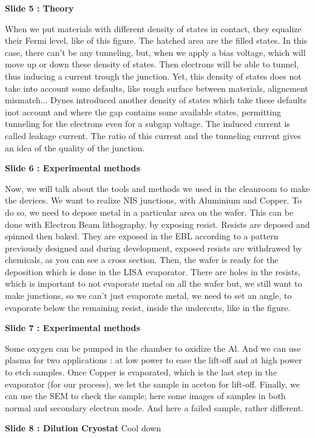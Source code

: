 \documentclass[a4paper,11pt]{article}
\begin{document}
{\Large \textbf{Slide 5 : Theory}}

When we put materials with different density of states in contact, they equalize their Fermi level, like of this figure. The hatched area are the filled states. In this case, there can't be any tunneling, but, when we apply a bias voltage, which will move up or down these density of states. Then electrons will be able to tunnel, thus inducing a current trough the junction. Yet, this density of states does not take into account some defaults, like rough surface between materials, alignement mismatch... Dynes introduced another density of states which take these defaults inot account and where the gap contains some available states, permitting tunneling for the electrons even for a subgap voltage. The induced current is called leakage current. The ratio of this current and the tunneling current gives an idea of the quality of the junction.
\medbreak

{\Large \textbf{Slide 6 : Experimental methods}}

Now, we will talk about the tools and methods we used in the cleanroom to make the devices. We want to realize NIS junctions, with Aluminium and Copper. To do so, we need to depose metal in a particular area on the wafer. This can be done with Electron Beam lithography, by exposing resist. Resists are deposed and spinned then baked. They are exposed in the EBL according to a pattern previously designed and during development, exposed resists are withdrawed by chemicals, as you can see a cross section.
Then, the wafer is ready for the deposition which is done in the LISA evaporator. There are holes in the resists, which is important to not evaporate metal on all the wafer but, we still want to make junctions, so we can't just evaporate metal, we need to set an angle, to evaporate below the remaining resist, inside the undercuts, like in the figure. 
\medbreak 

{\Large \textbf{Slide 7 : Experimental methods}}

Some oxygen can be pumped in the chamber to oxidize the Al. And we can use plasma for two applications : at low power to ease the lift-off and at high power to etch samples. Once Copper is evaporated, which is the last step in the evaporator (for our process), we let the sample in aceton for lift-off. Finally, we can use the SEM to check the sample; here some images of samples in both normal and secondary electron mode. And here a failed sample, rather different.
\medbreak 

{\Large \textbf{Slide 8 : Dilution Cryostat}}
Cool down
\medbreak
\end{document}
